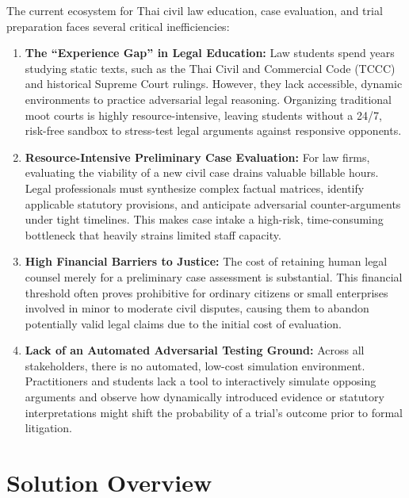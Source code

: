 The current ecosystem for Thai civil law education, case evaluation, and trial preparation faces several critical inefficiencies:
\begin{enumerate}
    \item \textbf{The ``Experience Gap'' in Legal Education:} Law students spend years studying static texts, such as the Thai Civil and Commercial Code (TCCC) and historical Supreme Court rulings. However, they lack accessible, dynamic environments to practice adversarial legal reasoning. Organizing traditional moot courts is highly resource-intensive, leaving students without a 24/7, risk-free sandbox to stress-test legal arguments against responsive opponents.
    \item \textbf{Resource-Intensive Preliminary Case Evaluation:} For law firms, evaluating the viability of a new civil case drains valuable billable hours. Legal professionals must synthesize complex factual matrices, identify applicable statutory provisions, and anticipate adversarial counter-arguments under tight timelines. This makes case intake a high-risk, time-consuming bottleneck that heavily strains limited staff capacity.
    \item \textbf{High Financial Barriers to Justice:} The cost of retaining human legal counsel merely for a preliminary case assessment is substantial. This financial threshold often proves prohibitive for ordinary citizens or small enterprises involved in minor to moderate civil disputes, causing them to abandon potentially valid legal claims due to the initial cost of evaluation.
    \item \textbf{Lack of an Automated Adversarial Testing Ground:} Across all stakeholders, there is no automated, low-cost simulation environment. Practitioners and students lack a tool to interactively simulate opposing arguments and observe how dynamically introduced evidence or statutory interpretations might shift the probability of a trial's outcome prior to formal litigation.
\end{enumerate}

\section{Solution Overview}
\label{section:solution-overview}

